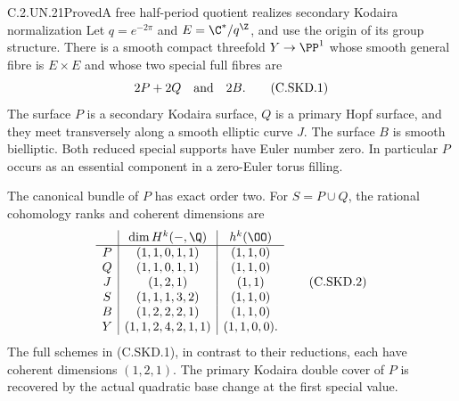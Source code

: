 \begin{statement}{C.2.UN.21}{Proved}{A free half-period quotient realizes secondary Kodaira normalization}
Let $q=e^{-2\pi}$ and $E=\C^*/q^{\Z}$, and use the
origin of its group structure. There is a smooth compact
threefold $Y\to\PP^1$ whose smooth general fibre is
$E\times E$ and whose two special full fibres are
\[
                        2P+2Q\quad\hbox{and}\quad 2B.
                                                            \tag{C.SKD.1}
\]
The surface $P$ is a secondary Kodaira surface, $Q$ is
a primary Hopf surface, and they meet transversely along
a smooth elliptic curve $J$. The surface $B$ is smooth
bielliptic. Both reduced special supports have Euler
number zero. In particular $P$ occurs as an essential
component in a zero-Euler torus filling.

The canonical bundle of $P$ has exact order two. For
$S=P\cup Q$, the rational cohomology ranks and coherent
dimensions are
\[
 \begin{array}{c|c|c}
 &\dim H^k(-,\Q)&h^k(\OO)\\ \hline
 P&(1,1,0,1,1)&(1,1,0)\\
 Q&(1,1,0,1,1)&(1,1,0)\\
 J&(1,2,1)&(1,1)\\
 S&(1,1,1,3,2)&(1,1,0)\\
 B&(1,2,2,2,1)&(1,1,0)\\
 Y&(1,1,2,4,2,1,1)&(1,1,0,0).
 \end{array}                                             \tag{C.SKD.2}
\]
The full schemes in (C.SKD.1), in contrast to their
reductions, each have coherent dimensions $(1,2,1)$.
The primary Kodaira double cover of $P$ is recovered
by the actual quadratic base change at the first
special value.
\end{statement}

